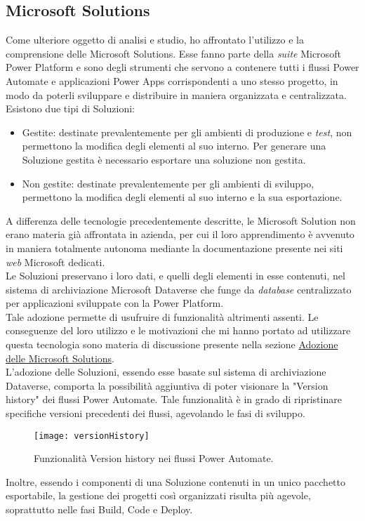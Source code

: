\subsection{Microsoft Solutions}
Come ulteriore oggetto di analisi e studio, ho affrontato l'utilizzo e la comprensione delle Microsoft Solutions.
Esse fanno parte della \emph{suite} Microsoft Power Platform e sono degli strumenti che servono a contenere tutti i flussi Power Automate e applicazioni Power Apps corrispondenti a uno stesso progetto, in modo da poterli sviluppare e distribuire in maniera organizzata e centralizzata.\\
Esistono due tipi di Soluzioni: 
\begin{itemize}
    \item Gestite: destinate prevalentemente per gli ambienti di produzione e \emph{test}, non permettono la modifica degli elementi al suo interno. Per generare una Soluzione gestita è necessario esportare una soluzione non gestita.
    \item Non gestite: destinate prevalentemente per gli ambienti di sviluppo, permettono la modifica degli elementi al suo interno e la sua esportazione.
\end{itemize}
A differenza delle tecnologie precedentemente descritte, le Microsoft Solution non erano materia già affrontata in azienda, per cui il loro apprendimento è avvenuto in maniera totalmente autonoma mediante la documentazione presente nei siti \emph{web} Microsoft dedicati.\\
Le Soluzioni preservano i loro dati, e quelli degli elementi in esse contenuti, nel sistema di archiviazione Microsoft Dataverse che funge da \emph{database} centralizzato per applicazioni sviluppate con la Power Platform.\\
Tale adozione permette di usufruire di funzionalità altrimenti assenti.
Le conseguenze del loro utilizzo e le motivazioni che mi hanno portato ad utilizzare questa tecnologia sono materia di discussione presente nella sezione \hyperref[progettazioneSolutions]{Adozione delle Microsoft Solutions}.\\

L'adozione delle Soluzioni, essendo esse basate sul sistema di archiviazione Dataverse, comporta la possibilità aggiuntiva di poter visionare la "Version history" dei flussi Power Automate. Tale funzionalità è in grado di ripristinare specifiche versioni precedenti dei flussi, agevolando le fasi di sviluppo.
\begin{figure}[htbp] 
    \centering 
    \texttt{[image: versionHistory]} 
    \caption{Funzionalità Version history nei flussi Power Automate.}
    \label{fig:versionHistory}
\end{figure}
\newline \noindent Inoltre, essendo i componenti di una Soluzione contenuti in un unico pacchetto esportabile, la gestione dei progetti così organizzati risulta più agevole, soprattutto nelle fasi Build, Code e Deploy. 



